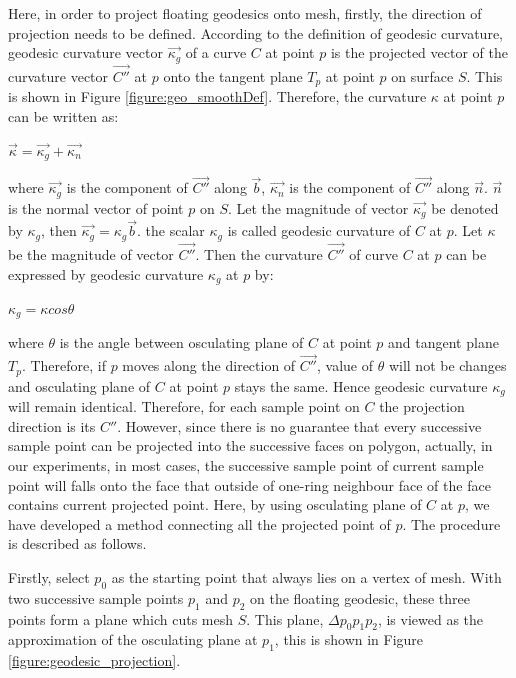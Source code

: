 Here, in order to project floating geodesics onto mesh, firstly, the direction of projection needs to be defined. According to the definition of geodesic curvature, geodesic curvature vector $\vec{\kappa_{g}}$ of a curve $C$ at point $p$ is the projected vector of the curvature vector $\vec{C''}$ at $p$ onto the tangent plane $T_{p}$ at point $p$ on surface $S$. This is shown in Figure \ref{figure:geo_smoothDef}. Therefore, the curvature $\kappa$ at point $p$ can be written as: 

$\vec{\kappa} = \vec{\kappa_{g}} + \vec{\kappa_{n}}$

where $\vec{\kappa_{g}}$ is the component of $\vec{C''}$ along $\vec{b}$, $\vec{\kappa_{n}}$ is the component of $\vec{C''}$ along $\vec{n}$. $\vec{n}$ is the normal vector of point $p$ on $S$. Let the magnitude of vector $\vec{\kappa_{g}}$ be denoted by $\kappa_{g}$, then $\vec{\kappa_{g}} = \kappa_{g}\vec{b}$. the scalar $\kappa_{g}$ is called geodesic curvature of $C$ at $p$. Let $\kappa$ be the magnitude of vector $\vec{C''}$. Then the curvature $\vec{C''}$ of curve $C$ at $p$ can be expressed by geodesic curvature $\kappa_{g}$ at $p$ by:

$\kappa_{g} = \kappa cos\theta$

where $\theta$ is the angle between osculating plane of $C$ at point $p$ and tangent plane $T_{p}$. Therefore, if $p$ moves along the direction of $\vec{C''}$, value of $\theta$ will not be changes and osculating plane of $C$ at point $p$ stays the same. Hence geodesic curvature $\kappa_{g}$ will remain identical. Therefore, for each sample point on $C$ the projection direction is its $C''$. However, since there is no guarantee that every successive sample point can be projected into the successive faces on polygon, actually, in our experiments, in most cases, the successive sample point of current sample point will falls onto the face that outside of one-ring neighbour face of the face contains current projected point. Here, by using osculating plane of $C$ at $p$, we have developed a method connecting all the projected point of $p$. The procedure is described as follows. 

Firstly, select $p_{0}$ as the starting point that always lies on a vertex of mesh. With two successive sample points $p_{1}$ and $p_{2}$ on the floating geodesic, these three points form a plane which cuts mesh $S$. This plane, $\Delta p_{0}p_{1}p_{2}$, is viewed as the approximation of the osculating plane at $p_{1}$, this is shown in Figure \ref{figure:geodesic_projection}.

